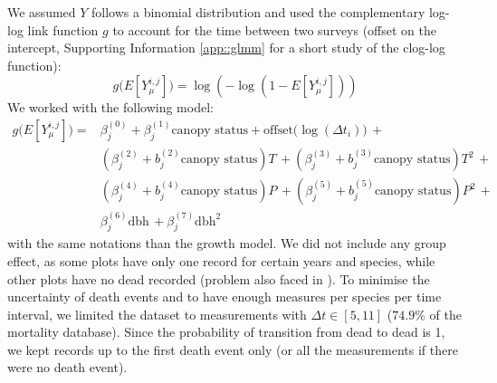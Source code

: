We assumed $ Y $ follows a binomial distribution and used the complementary log-log link function $ g $ to account for the time between two surveys (offset on the intercept, Supporting Information \ref{app::glmm} for a short study of the clog-log function):
\[
	g \big(E[Y_\mu^{i, j}] \big) = \log \left( -\log(1 - E[Y_\mu^{i, j}]) \right)
\]
We worked with the following model:
\begin{equation}\label{eq::glmm_mortality}
\begin{split}
	g \big(E[Y_\mu^{i, j}] \big) = & \beta_{j}^{(0)}  + \beta_j^{(1)}  \text{canopy status} +
		\text{offset}\big(\log(\Delta t_i) \big) \, + \\
	& \left(\beta_j^{(2)} + b_j^{(2)} \text{canopy status} \right) T \, +
	\left(\beta_j^{(3)} + b_j^{(3)} \text{canopy status} \right) T^2 \, + \\
	& \left(\beta_j^{(4)} + b_j^{(4)} \text{canopy status} \right) P \, +
	\left(\beta_j^{(5)} + b_j^{(5)} \text{canopy status} \right) P^2 \, + \\
	& \beta_j^{(6)} \text{dbh} \, + \beta_j^{(7)} \text{dbh}^2
\end{split}
\end{equation}
with the same notations than the growth model. We did not include any group effect, as some plots have only one record for certain years and species, while other plots have no dead recorded (problem also faced in \citet{Kunstler2019}). To minimise the uncertainty of death events and to have enough measures per species per time interval, we limited the dataset to measurements with $ \Delta t \in [5, 11] $ ($ 74.9 \% $ of the mortality database). Since the probability of transition from dead to dead is 1, we kept records up to the first death event only (or all the measurements if there were no death event). \\

